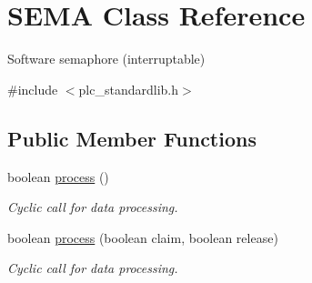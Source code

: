 \hypertarget{class_s_e_m_a}{\section{S\+E\+M\+A Class Reference}
\label{class_s_e_m_a}
}


Software semaphore (interruptable)  




{\ttfamily \#include $<$plc\+\_\+standardlib.\+h$>$}

\subsection*{Public Member Functions}
\begin{DoxyCompactItemize}
\item 
\hypertarget{class_s_e_m_a_acf691410eccec2dafad4f12f9a5e4302}{boolean \hyperlink{class_s_e_m_a_acf691410eccec2dafad4f12f9a5e4302}{process} ()}\label{class_s_e_m_a_acf691410eccec2dafad4f12f9a5e4302}

\begin{DoxyCompactList}\small\item\em Cyclic call for data processing. \end{DoxyCompactList}\item 
\hypertarget{class_s_e_m_a_a8e8c20a2231d22ee4b31aae82fdb2fae}{boolean \hyperlink{class_s_e_m_a_a8e8c20a2231d22ee4b31aae82fdb2fae}{process} (boolean claim, boolean release)}\label{class_s_e_m_a_a8e8c20a2231d22ee4b31aae82fdb2fae}

\begin{DoxyCompactList}\small\item\em Cyclic call for data processing. \end{DoxyCompactList}\end{DoxyCompactItemize}
